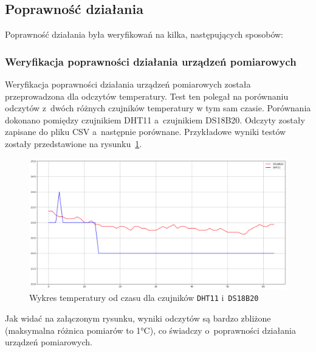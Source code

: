 \subsection{Poprawność działania}
Poprawność działania była weryfikowań na kilka, następujących sposobów:

\subsubsection{Weryfikacja poprawności działania urządzeń pomiarowych}

Weryfikacja poprawności działania urządzeń pomiarowych została przeprowadzona dla odczytów temperatury.
Test ten polegał na porównaniu odczytów z~dwóch różnych czujników temperatury w tym sam czasie.
Porównania dokonano pomiędzy czujnikiem DHT11 a~czujnikiem DS18B20.
Odczyty zostały zapisane do pliku CSV a~następnie porównane.
Przykładowe wyniki testów zostały przedstawione na rysunku~\ref{rys:dht-vs-ds}.

\begin{figure}[b!]
    \begin{center}
        \includegraphics[width=15cm]{pic/dht-vs-ds.png}
    \end{center}
    \caption{Wykres temperatury od czasu dla czujników \texttt{DHT11} i~\texttt{DS18B20}}\label{rys:dht-vs-ds}
\end{figure}

Jak widać na załączonym rysunku, wyniki odczytów są bardzo zbliżone (maksymalna różnica pomiarów to 1°C), co świadczy o~poprawności działania urządzeń pomiarowych.

